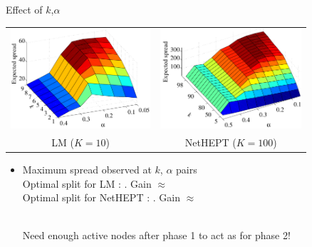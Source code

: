 \documentclass{beamer}
\newcommand{\kn}{$k$}
\begin{document}
\begin{frame}{Effect of \protect\kn,$\alpha$}
  \begin{center}
    \vspace{-5mm}
    \begin{tabular}{cc}
      \includegraphics[height = 3.7cm]{LM_3d_plot_cropped.pdf}
      &
      \includegraphics[height = 3.7cm]{Coverage_3d_TV_cropped.pdf}
      \\ %
      LM ($K=10$)
      &
      NetHEPT ($K=100$)
      \\ %
    \end{tabular}
  \end{center}
  \pause
  \begin{itemize}
    \item Maximum spread observed at {\color{red}{high}} $k$, {\color{red}{low}} $\alpha$ pairs\\
    Optimal split for LM : {\color{blue}{(7, 0.15)}}. Gain $\approx$ {\color{blue}{6\%}}
    \\
    Optimal split for NetHEPT : {\color{blue}{(82, 0.15)}}. Gain $\approx$  {\color{blue}{7\%}}
    \pause 
    \\
    {\color{blue}{WHY?}}\\
    \pause
	
    Need enough active nodes after phase 1 to act as {\color{red}{referring agents}} for phase 2!
    \end{itemize}
\end{frame}
\end{document}
